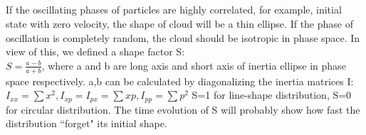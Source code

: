 \documentclass[aps,pre,twocolumn,groupedaddress]{revtex4-1}
\begin{document}
\subsection{{\color{red}{Shape of Distribution in Phase-space}}}
If the oscillating phases of particles are highly correlated, for example, initial state with zero velocity, the shape of cloud will be a thin ellipse. If the phase of oscillation is completely random, the cloud should be isotropic in phase space. In view of this, we defined a shape factor S:
\\$S=\frac{a-b}{a+b}$, where a and b are long axis and short axis of inertia ellipse in phase space respectively. a,b can be calculated by diagonalizing the inertia matrices I: $I_{xx}=\sum{x^2}, I_{xp}=I_{px}=\sum{xp},I_{pp}=\sum{p^2}$
S=1 for line-shape distribution, S=0 for circular distribution.
The time evolution of S will probably show how fast the distribution ``forget" its initial shape.  
\end{document}
